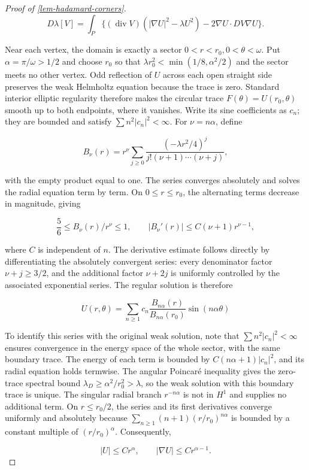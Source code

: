 \documentclass[11pt,a4paper]{article}
\theoremstyle{proofmanuscript}
\begin{document}
\begin{proof}[Proof of \ref{lem-hadamard-corners}]
\[
D\lambda[V]=\int_P\{(\operatorname{div}V)(|\nabla U|^2-\lambda U^2)-2\nabla U\cdot DV\nabla U\}.
\]

Near each vertex, the domain is exactly a sector \(0<r<r_0,0<\theta<\omega\). Put \(\alpha=\pi/\omega>1/2\) and choose \(r_0\) so that \(\lambda r_0^2<\min(1/8,\alpha^2/2)\) and the sector meets no other vertex. Odd reflection of \(U\) across each open straight side preserves the weak Helmholtz equation because the trace is zero. Standard interior elliptic regularity therefore makes the circular trace \(F(\theta)=U(r_0,\theta)\) smooth up to both endpoints, where it vanishes. Write its sine coefficients as \(c_n\); they are bounded and satisfy \(\sum n^2|c_n|^2<\infty\). For \(\nu=n\alpha\), define

\[
B_\nu(r)=r^\nu\sum_{j\ge0}\frac{(-\lambda r^2/4)^j}{j!(\nu+1)\cdots(\nu+j)},
\]

with the empty product equal to one. The series converges absolutely and solves the radial equation term by term. On \(0\le r\le r_0\), the alternating terms decrease in magnitude, giving

\[
\frac56\le B_\nu(r)/r^\nu\le1,\qquad
|B_\nu'(r)|\le C(\nu+1)r^{\nu-1},
\]

where \(C\) is independent of \(n\). The derivative estimate follows directly by differentiating the absolutely convergent series: every denominator factor \(\nu+j\ge3/2\), and the additional factor \(\nu+2j\) is uniformly controlled by the associated exponential series. The regular solution is therefore

\[
U(r,\theta)=\sum_{n\ge1}c_n\frac{B_{n\alpha}(r)}{B_{n\alpha}(r_0)}\sin(n\alpha\theta)
\]

To identify this series with the original weak solution, note that \(\sum n^2|c_n|^2<\infty\) ensures convergence in the energy space of the whole sector, with the same boundary trace. The energy of each term is bounded by \(C(n\alpha+1)|c_n|^2\), and its radial equation holds termwise. The angular Poincaré inequality gives the zero-trace spectral bound \(\lambda_D\ge\alpha^2/r_0^2>\lambda\), so the weak solution with this boundary trace is unique. The singular radial branch \(r^{-n\alpha}\) is not in \(H^1\) and supplies no additional term. On \(r\le r_0/2\), the series and its first derivatives converge uniformly and absolutely because \(\sum_{n\ge1}(n+1)(r/r_0)^{n\alpha}\) is bounded by a constant multiple of \((r/r_0)^\alpha\). Consequently,

\[
|U|\le Cr^\alpha,\qquad |\nabla U|\le Cr^{\alpha-1}.
\]


\end{proof}
\end{document}
